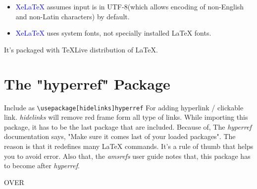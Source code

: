 \documentclass[10 pt]{book}
\begin{document}
\begin{itemize}
	\item \textcolor{blue}{XeLaTeX} assumes input is in UTF-8(which allows encoding of non-English and non-Latin characters) by default.
	\item \textcolor{blue}{XeLaTeX} uses system fonts, not specially installed \LaTeX{} fonts.
\end{itemize}

It's packaged with TeXLive distribution of \LaTeX{}.

\section{The "hyperref" Package}
Include as \texttt{\textbackslash usepackage[hidelinks]{hyperref}}
For adding hyperlink / clickable link. \textit{hidelinks} will remove red frame form all type of links. While importing this package, it has to be the last package that are included. Because of, The \textit{hyperref} documentation says, "Make sure it comes last of your loaded packages". The reason is that it redefines many \LaTeX{} commands. It's a rule of thumb that helps you to avoid error. Also that, the \textit{amsrefs} user guide notes that, this package has to become after \textit{hyperref}.

\begin{center}
	\begin{tcolorbox}[enhanced,
		size=minimal, auto outer arc,
		width=2.1cm, octogon arc,
		colback=red, colframe=white, colupper=white,
		fontupper=\fontsize{7mm}{7mm}\selectfont\bfseries\sffamily,
		halign=center, valign=center,
		square,arc is angular,
		borderline={0.2mm}{-1mm}{blue!70!green}]
		OVER
	\end{tcolorbox}
\end{center}
\end{document}
